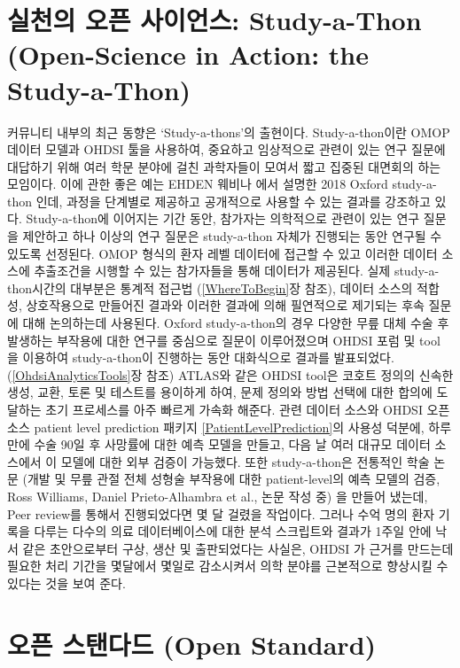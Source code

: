 \documentclass[11pt]{book}
\theoremstyle{definition}
\theoremstyle{definition}
\theoremstyle{definition}
\theoremstyle{remark}
\begin{document}
\section{실천의 오픈 사이언스: Study-a-Thon (Open-Science in Action: the
Study-a-Thon)}\label{---study-a-thon-open-science-in-action-the-study-a-thon}


커뮤니티 내부의 최근 동향은 `Study-a-thons'의 출현이다. Study-a-thon이란
OMOP 데이터 모델과 OHDSI 툴을 사용하여, 중요하고 임상적으로 관련이 있는
연구 질문에 대답하기 위해 여러 학문 분야에 걸친 과학자들이 모여서 짧고
집중된 대면회의 하는 모임이다. 이에 관한 좋은 예는 EHDEN 웨비나 에서
설명한 2018 Oxford study-a-thon 인데, 과정을 단계별로 제공하고
공개적으로 사용할 수 있는 결과를 강조하고 있다. Study-a-thon에 이어지는
기간 동안, 참가자는 의학적으로 관련이 있는 연구 질문을 제안하고 하나
이상의 연구 질문은 study-a-thon 자체가 진행되는 동안 연구될 수 있도록
선정된다. OMOP 형식의 환자 레벨 데이터에 접근할 수 있고 이러한 데이터
소스에 추출조건을 시행할 수 있는 참가자들을 통해 데이터가 제공된다. 실제
study-a-thon시간의 대부분은 통계적 접근법 (\ref{WhereToBegin}장 참조),
데이터 소스의 적합성, 상호작용으로 만들어진 결과와 이러한 결과에 의해
필연적으로 제기되는 후속 질문에 대해 논의하는데 사용된다. Oxford
study-a-thon의 경우 다양한 무릎 대체 수술 후 발생하는 부작용에 대한
연구를 중심으로 질문이 이루어졌으며 OHDSI 포럼 및 tool 을 이용하여
study-a-thon이 진행하는 동안 대화식으로 결과를 발표되었다.
(\ref{OhdsiAnalyticsTools}장 참조) ATLAS와 같은 OHDSI tool은 코호트
정의의 신속한 생성, 교환, 토론 및 테스트를 용이하게 하여, 문제 정의와
방법 선택에 대한 합의에 도달하는 초기 프로세스를 아주 빠르게 가속화
해준다. 관련 데이터 소스와 OHDSI 오픈소스 patient level prediction
패키지 \ref{PatientLevelPrediction}의 사용성 덕분에, 하루만에 수술 90일
후 사망률에 대한 예측 모델을 만들고, 다음 날 여러 대규모 데이터 소스에서
이 모델에 대한 외부 검증이 가능했다. 또한 study-a-thon은 전통적인 학술
논문 (개발 및 무릎 관절 전체 성형술 부작용에 대한 patient-level의 예측
모델의 검증, Ross Williams, Daniel Prieto-Alhambra et al., 논문 작성 중)
을 만들어 냈는데, Peer review를 통해서 진행되었다면 몇 달 걸렸을
작업이다. 그러나 수억 명의 환자 기록을 다루는 다수의 의료 데이터베이스에
대한 분석 스크립트와 결과가 1주일 안에 낙서 같은 초안으로부터 구상, 생산
및 출판되었다는 사실은, OHDSI 가 근거를 만드는데 필요한 처리 기간을
몇달에서 몇일로 감소시켜서 의학 분야를 근본적으로 향상시킬 수 있다는
것을 보여 준다.

\section{오픈 스탠다드 (Open Standard)}\label{--open-standard}
\end{document}

